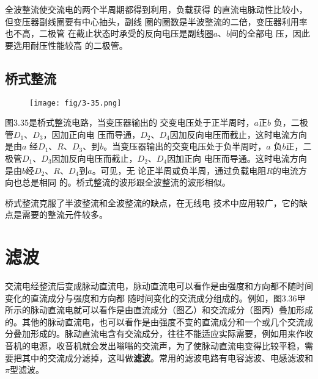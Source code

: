 全波整流使交流电的两个半周期都得到利用，负载获得
的直流电脉动性比较小，但变压器副线圈要有中心抽头，副线
圈的圈数是半波整流的二倍，变压器利用率也不高，二极管
在截止状态时承受的反向电压是副线圈$a$、$b$间的全部电
压，因此要选用耐压性能较高
的二极管。

\subsection{桥式整流}
\begin{figure}[htp]\centering
\texttt{[image: fig/3-35.png]}
\caption{}
\end{figure}

图3.35是桥式整流电路，当变压器输出的
交变电压处于正半周时，$a$正$b$
负，二极管$D_1$、$D_3$，因加正向电
压而导通，$D_2$、$D_4$因加反向电压而截止，这时电流方向是由$a$
经$D_1$、$R$、$D_3$、到$b$。当变压器输出的交变电压处于负半周时，$a$
负$b$正，二极管$D_1$、$D_3$因加反向电压而截止，$D_2$、$D_4$因加正向
电压而导通。这时电流方向是由$b$经$D_2$、$R$、$D_4$到$a$。可见，无
论正半周或负半周，通过负载电阻$R$的电流方向也总是相同
的。桥式整流的波形跟全波整流的波形相似。

桥式整流克服了半波整流和全波整流的缺点，在无线电
技术中应用较广，它的缺点是需要的整流元件较多。


\section{滤波}
交流电经整流后变成脉动直流电，脉动直流电可以看作是由强度和方向都不随时间变化的直流成分与强度和方向都
随时间变化的交流成分组成的。例如，图3.36甲所示的脉动直流电就可以看作是由直流成分（图乙）和交流成分（图丙）叠加形成的。其他的脉动直流电，也可以看作是由强度不变的直流成分和一个或几个交流成分叠加形成的。脉动直流电含有交流成分，往往不能适应实际需要，例如用来作收音机的电源，收音机就会发出嗡嗡的交流声，为了使脉动直流电变得比较平稳，需要把其中的交流成分滤掉，这叫做\textbf{滤波}。常用的滤波电路有电容滤波、电感滤波和$\pi$型滤波。
\begin{figure}[htp]\centering
        \caption{}
\end{figure}

